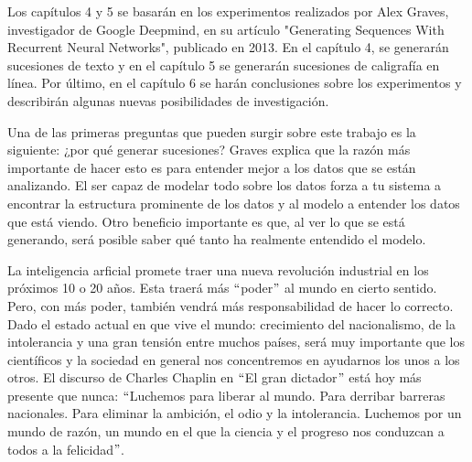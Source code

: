 \vspace{1em}

Los capítulos 4 y 5 se basarán en los experimentos realizados por Alex Graves, investigador de Google Deepmind, en su artículo "Generating Sequences With Recurrent Neural Networks", publicado en 2013. En el capítulo 4, se generarán sucesiones de texto y en el capítulo 5 se generarán sucesiones de caligrafía en línea. Por último, en el capítulo 6 se harán conclusiones sobre los experimentos y describirán algunas nuevas posibilidades de investigación. \cite{DBLP:journals/corr/Graves13}

\vspace{1em}

Una de las primeras preguntas que pueden surgir sobre este trabajo es la siguiente: ¿por qué generar sucesiones? Graves explica que la razón más importante de hacer esto es para entender mejor a los datos que se están analizando. El ser capaz de modelar todo sobre los datos forza a tu sistema a encontrar la estructura prominente de los datos y al modelo a entender los datos que está viendo. Otro beneficio importante es que, al ver lo que se está generando, será posible saber qué tanto ha realmente entendido el modelo. 
\cite{graves}
\cite{DBLP:journals/corr/Graves13}

\vspace{1em}

La inteligencia arficial promete traer una nueva revolución industrial en los próximos 10 o 20 años. Esta traerá más $``$poder$"$ al mundo en cierto sentido. Pero, con más poder, también vendrá más responsabilidad de hacer lo correcto. Dado el estado actual en que vive el mundo: crecimiento del nacionalismo, de la intolerancia y una gran tensión entre muchos países, será muy importante que los científicos y la sociedad en general nos concentremos en ayudarnos los unos a los otros. El discurso de Charles Chaplin en $``$El gran dictador$"$ está hoy más presente que nunca: $``$Luchemos para liberar al mundo. Para derribar barreras nacionales. Para eliminar la ambición, el odio y la intolerancia. Luchemos por un mundo de razón, un mundo en el que la ciencia y el progreso nos conduzcan a todos a la felicidad$"$.
\cite{goodfellow-et-al-2016}






